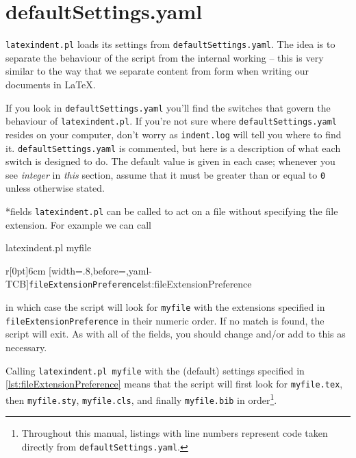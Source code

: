 \section{defaultSettings.yaml}\label{sec:defuseloc}
 \texttt{latexindent.pl} loads its settings from \texttt{defaultSettings.yaml}. The idea is to separate the behaviour of the script
 from the internal working -- this is very similar to the way that we separate content
 from form when writing our documents in \LaTeX.

 If you look in \texttt{defaultSettings.yaml} you'll find the switches
 that govern the behaviour of \texttt{latexindent.pl}. If you're not sure where
 \texttt{defaultSettings.yaml} resides on your computer, don't worry as \texttt{indent.log}
 will tell you where to find it.
 \texttt{defaultSettings.yaml} is commented,
 but here is a description of what each switch is designed to do. The default
 value is given in each case; whenever you see \emph{integer} in \emph{this}
 section, assume that it must be greater than or equal to \texttt{0} unless
 otherwise stated.

*{fields}
	\texttt{latexindent.pl} can be called to
	act on a file without
	specifying the file extension.  For example we can call
	\begin{commandshell}
latexindent.pl myfile
\end{commandshell}
	\begin{wrapfigure}[8]{r}[0pt]{6cm}
		[width=.8\linewidth,before=\centering,yaml-TCB]{\texttt{fileExtensionPreference}}{lst:fileExtensionPreference}
	\end{wrapfigure}

	in which case the script will look for \texttt{myfile} with the extensions
	specified in \texttt{fileExtensionPreference} in their numeric order. If
	no match is found, the script will exit. As with all of the fields, you should
	change and/or add to this as necessary.

	Calling \texttt{latexindent.pl myfile} with the (default) settings specified in \cref{lst:fileExtensionPreference}
	means that the script will first look for \texttt{myfile.tex}, then \texttt{myfile.sty}, \texttt{myfile.cls},
	and finally \texttt{myfile.bib} in order\footnote{Throughout this manual, listings with line numbers represent code
		taken directly from \texttt{defaultSettings.yaml}.}.


